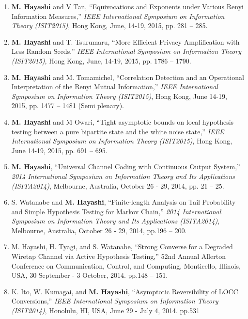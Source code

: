 \documentclass[a4paper,12pt,oneside]{article}
\begin{document}
\begin{enumerate}
    \item
    \textbf{M. Hayashi} and V Tan, 
    ``Equivocations and Exponents under Various Renyi Information Measures,'' 
    {\em IEEE International Symposium on Information Theory (ISIT2015)},
    Hong Kong, June, 14-19, 2015, pp. 281 -- 285.
    
    \item
    \textbf{M. Hayashi} and T. Tsurumaru, 
    ``More Efficient Privacy Amplification with Less Random Seeds,'' 
    {\em IEEE International Symposium on Information Theory (ISIT2015)},
    Hong Kong, June, 14-19, 2015, pp. 1786 -- 1790.
    
    \item
    \textbf{M. Hayashi} and M. Tomamichel, 
    ``Correlation Detection and an Operational Interpretation of the Renyi Mutual Information,'' 
    {\em IEEE International Symposium on Information Theory (ISIT2015)},
    Hong Kong, June 14-19, 2015, pp. 1477 -- 1481 (Semi plenary).
    
    \item
    \textbf{M. Hayashi} and M Owari, 
    ``Tight asymptotic bounds on local hypothesis testing between a pure bipartite state and the white noise state,'' 
    {\em IEEE International Symposium on Information Theory (ISIT2015)},
    Hong Kong, June 14-19, 2015, pp. 691 -- 695.
    
    \item
    \textbf{M. Hayashi},
    ``Universal Channel Coding with Continuous Output System,'' 
    {\em 2014 International Symposium on Information Theory and Its Applications (ISITA2014)}, Melbourne, Australia, October 26 - 29, 2014, pp. 21 -- 25.
    
    \item
    S. Watanabe and \textbf{M. Hayashi},
    ``Finite-length Analysis on Tail Probability and Simple Hypothesis Testing for Markov Chain,'' 
    {\em 2014 International Symposium on Information Theory and Its Applications (ISITA2014)}, Melbourne, Australia, October 26 - 29, 2014, pp.196 -- 200.
    
    \item
    M. Hayashi, H. Tyagi, and S. Watanabe, ``Strong Converse for a Degraded Wiretap Channel via Active Hypothesis Testing,'' 52nd Annual Allerton Conference on Communication, Control, and Computing, Monticello, Illinois, USA, 30 September - 3 October, 2014. pp.148 -- 151.
    
    \item
    K. Ito, W. Kumagai, and \textbf{M. Hayashi}, 
    ``Asymptotic Reversibility of LOCC Conversions,'' 
    {\em IEEE International Symposium on Information Theory (ISIT2014)}, Honolulu, HI, USA, June 29 - July 4, 
    2014. pp.531
    

\end{enumerate}
\end{document}
